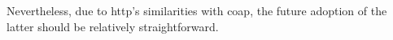 Nevertheless, due to \ac{http}'s similarities with \ac{coap}, the future adoption of the latter should be relatively straightforward.

